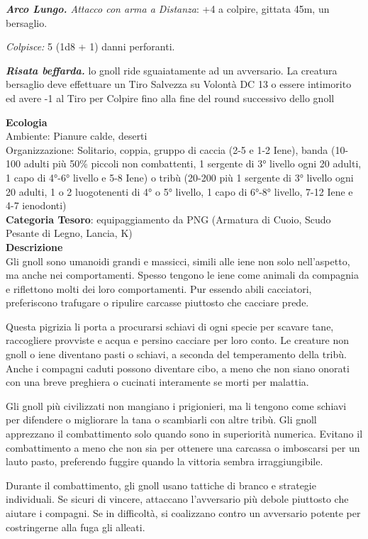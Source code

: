 \begin{multicols}{2}
{\emph{\textbf{Arco Lungo.} Attacco con arma a Distanza}: +4 a colpire, gittata 45m, un bersaglio.

\emph{Colpisce:} 5 (1d8 + 1) danni perforanti.

\emph{\textbf{Risata beffarda.}} lo gnoll ride sguaiatamente ad un avversario. La creatura bersaglio deve effettuare un Tiro Salvezza su Volontà DC 13 o essere intimorito ed avere -1 al Tiro per Colpire fino alla fine del round successivo dello gnoll

\textbf{Ecologia}\\
Ambiente: Pianure calde, deserti\\
Organizzazione: Solitario, coppia, gruppo di caccia (2-5 e 1-2 Iene), banda (10-100 adulti più 50\% piccoli non combattenti, 1 sergente di 3° livello ogni 20 adulti, 1 capo di 4°-6° livello e 5-8 Iene) o tribù (20-200 più 1 sergente di 3° livello ogni 20 adulti, 1 o 2 luogotenenti di 4° o 5° livello, 1 capo di 6°-8° livello, 7-12 Iene e 4-7 ienodonti)\\
\textbf{Categoria Tesoro}: equipaggiamento da PNG (Armatura di Cuoio, Scudo Pesante di Legno, Lancia, K)\\
\textbf{Descrizione}\\
Gli gnoll sono umanoidi grandi e massicci, simili alle iene non solo nell'aspetto, ma anche nei comportamenti. Spesso tengono le iene come animali da compagnia e riflettono molti dei loro comportamenti. Pur essendo abili cacciatori, preferiscono trafugare o ripulire carcasse piuttosto che cacciare prede.

Questa pigrizia li porta a procurarsi schiavi di ogni specie per scavare tane, raccogliere provviste e acqua e persino cacciare per loro conto. Le creature non gnoll o iene diventano pasti o schiavi, a seconda del temperamento della tribù. Anche i compagni caduti possono diventare cibo, a meno che non siano onorati con una breve preghiera o cucinati interamente se morti per malattia.

Gli gnoll più civilizzati non mangiano i prigionieri, ma li tengono come schiavi per difendere o migliorare la tana o scambiarli con altre tribù. Gli gnoll apprezzano il combattimento solo quando sono in superiorità numerica. Evitano il combattimento a meno che non sia per ottenere una carcassa o imboscarsi per un lauto pasto, preferendo fuggire quando la vittoria sembra irraggiungibile.

Durante il combattimento, gli gnoll usano tattiche di branco e strategie individuali. Se sicuri di vincere, attaccano l'avversario più debole piuttosto che aiutare i compagni. Se in difficoltà, si coalizzano contro un avversario potente per costringerne alla fuga gli alleati.

}
\end{multicols}
